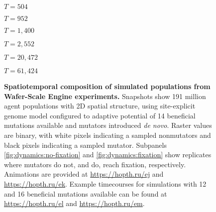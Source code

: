 \begin{figure}[ht]
{\begin{minipage}{\textwidth}
  \begin{minipage}[c]{0.154\textwidth}
\hfill
\begin{varwidth}{\textwidth}
$T = 504$
\end{varwidth}
\hfill
  \end{minipage}
  \begin{minipage}[c]{0.154\textwidth}
\hfill
\begin{varwidth}{\textwidth}
$T = 952$
\end{varwidth}
\hfill
  \end{minipage}
  \begin{minipage}[c]{0.154\textwidth}
\hfill
\begin{varwidth}{\textwidth}
$T = 1,400$
\end{varwidth}
\hfill
  \end{minipage}
  \begin{minipage}[c]{0.154\textwidth}
\hfill
\begin{varwidth}{\textwidth}
$T = 2,552$
\end{varwidth}
\hfill
  \end{minipage}
  \begin{minipage}[c]{0.154\textwidth}
\hfill
\begin{varwidth}{\textwidth}
$T = 20,472$
\end{varwidth}
\hfill
  \end{minipage}
  \begin{minipage}[c]{0.154\textwidth}
\hfill
\begin{varwidth}{\textwidth}
$T = 61,424$
\end{varwidth}
\hfill
  \end{minipage}

  \end{minipage}%
  }%

  \caption{
  \textbf{Spatiotemporal composition of simulated populations from Wafer-Scale Engine experiments.}
  \footnotesize
  Snapshots show 191 million agent populations with 2D spatial structure, using site-explicit genome model configured to adaptive potential of 14 beneficial mutations available and mutators introduced \textit{de novo}.
  Raster values are binary, with white pixels indicating a sampled nonmutators and black pixels indicating a sampled mutator.
  Subpanels \ref{fig:dynamics:no-fixation} and       \ref{fig:dynamics:fixation} show replicates where mutators do not, and do, reach fixation, respectively.
  Animations are provided at \url{https://hopth.ru/ej} and \url{https://hopth.ru/ek}.
  Example timecourses for simulations with 12 and 16 beneficial mutations available can be found at \url{https://hopth.ru/el} and \url{https://hopth.ru/em}.
  }
  \label{fig:dynamics}
\end{figure}
